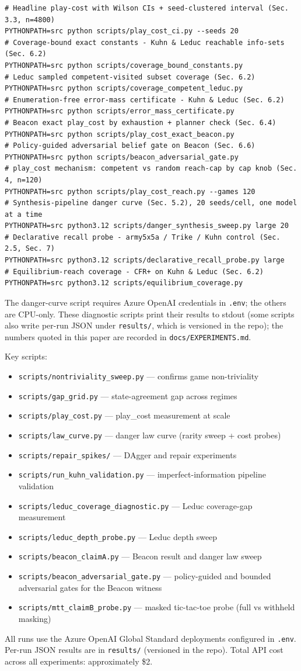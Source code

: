 \documentclass[11pt]{article}
\theoremstyle{remark}
\begin{document}
\begin{verbatim}
# Headline play-cost with Wilson CIs + seed-clustered interval (Sec. 3.3, n=4800)
PYTHONPATH=src python scripts/play_cost_ci.py --seeds 20
# Coverage-bound exact constants - Kuhn & Leduc reachable info-sets (Sec. 6.2)
PYTHONPATH=src python scripts/coverage_bound_constants.py
# Leduc sampled competent-visited subset coverage (Sec. 6.2)
PYTHONPATH=src python scripts/coverage_competent_leduc.py
# Enumeration-free error-mass certificate - Kuhn & Leduc (Sec. 6.2)
PYTHONPATH=src python scripts/error_mass_certificate.py
# Beacon exact play_cost by exhaustion + planner check (Sec. 6.4)
PYTHONPATH=src python scripts/play_cost_exact_beacon.py
# Policy-guided adversarial belief gate on Beacon (Sec. 6.6)
PYTHONPATH=src python scripts/beacon_adversarial_gate.py
# play_cost mechanism: competent vs random reach-cap by cap knob (Sec. 4, n=120)
PYTHONPATH=src python scripts/play_cost_reach.py --games 120
# Synthesis-pipeline danger curve (Sec. 5.2), 20 seeds/cell, one model at a time
PYTHONPATH=src python3.12 scripts/danger_synthesis_sweep.py large 20
# Declarative recall probe - army5x5a / Trike / Kuhn control (Sec. 2.5, Sec. 7)
PYTHONPATH=src python3.12 scripts/declarative_recall_probe.py large
# Equilibrium-reach coverage - CFR+ on Kuhn & Leduc (Sec. 6.2)
PYTHONPATH=src python3.12 scripts/equilibrium_coverage.py
\end{verbatim}

The danger-curve script requires Azure OpenAI credentials in \texttt{.env}; the others are CPU-only. These diagnostic scripts print their results to stdout (some scripts also write per-run JSON under \texttt{results/}, which is versioned in the repo); the numbers quoted in this paper are recorded in \texttt{docs/EXPERIMENTS.md}.

Key scripts:
\begin{itemize}
\item \texttt{scripts/nontriviality\_sweep.py} --- confirms game non-triviality
\item \texttt{scripts/gap\_grid.py} --- state-agreement gap across regimes
\item \texttt{scripts/play\_cost.py} --- play\_cost measurement at scale
\item \texttt{scripts/law\_curve.py} --- danger law curve (rarity sweep + cost probes)
\item \texttt{scripts/repair\_spikes/} --- DAgger and repair experiments
\item \texttt{scripts/run\_kuhn\_validation.py} --- imperfect-information pipeline validation
\item \texttt{scripts/leduc\_coverage\_diagnostic.py} --- Leduc coverage-gap measurement
\item \texttt{scripts/leduc\_depth\_probe.py} --- Leduc depth sweep
\item \texttt{scripts/beacon\_claimA.py} --- Beacon result and danger law sweep
\item \texttt{scripts/beacon\_adversarial\_gate.py} --- policy-guided and bounded adversarial gates for the Beacon witness
\item \texttt{scripts/mtt\_claimB\_probe.py} --- masked tic-tac-toe probe (full vs withheld masking)
\end{itemize}

All runs use the Azure OpenAI Global Standard deployments configured in \texttt{.env}. Per-run JSON results are in \texttt{results/} (versioned in the repo). Total API cost across all experiments: approximately \$2.


\end{document}
